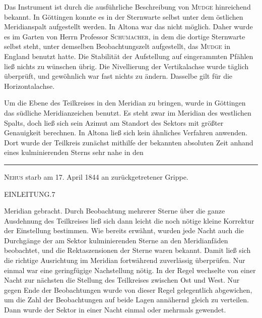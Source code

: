 Das Instrument ist durch die ausführliche Beschreibung von \textsc{Mudge} hinreichend
bekannt. In Göttingen konnte es in der Sternwarte selbst unter dem östlichen Meridianspalt
aufgestellt werden. In Altona war das nicht möglich. Daher wurde es im Garten von Herrn
Professor \textsc{Schumacher}, in dem die dortige Sternwarte selbst steht, unter demselben
Beobachtungszelt aufgestellt, das \textsc{Mudge} in England benutzt hatte. Die Stabilität der
Aufstellung auf eingerammten Pfählen ließ nichts zu wünschen übrig. Die Nivellierung der
Vertikalachse wurde täglich überprüft, und gewöhnlich war fast nichts zu ändern. Dasselbe
gilt für die Horizontalachse.

Um die Ebene des Teilkreises in den Meridian zu bringen, wurde in Göttingen das südliche
Meridianzeichen benutzt. Es steht zwar im Meridian des westlichen Spalts, doch ließ sich sein
Azimut am Standort des Sektors mit größter Genauigkeit berechnen. In Altona ließ sich kein
ähnliches Verfahren anwenden. Dort wurde der Teilkreis zunächst mithilfe der bekannten
absoluten Zeit anhand eines kulminierenden Sterns sehr nahe in den

\vfill\noindent\rule{.24\textwidth}{.4pt}\par
{\footnotesize{} \textsc{Nehus} starb am 17. April 1844 an zurückgetretener Grippe.\par}

\clearpage
\noindent\mbox{}\hfill EINLEITUNG.\hfill 7\par
\noindent Meridian gebracht. Durch Beobachtung mehrerer Sterne über die ganze Ausdehnung
des Teilkreises ließ sich dann leicht die noch nötige kleine Korrektur der Einstellung
bestimmen. Wie bereits erwähnt, wurden jede Nacht auch die Durchgänge der am Sektor
kulminierenden Sterne an den Meridianfäden beobachtet, und die Rektaszensionen der Sterne
waren bekannt. Damit ließ sich die richtige Ausrichtung im Meridian fortwährend zuverlässig
überprüfen. Nur einmal war eine geringfügige Nachstellung nötig. In der Regel wechselte
von einer Nacht zur nächsten die Stellung des Teilkreises zwischen Ost und West. Nur gegen
Ende der Beobachtungen wurde von dieser Regel gelegentlich abgewichen, um die Zahl der
Beobachtungen auf beide Lagen annähernd gleich zu verteilen. Dann wurde der Sektor in
einer Nacht einmal oder mehrmals gewendet.

